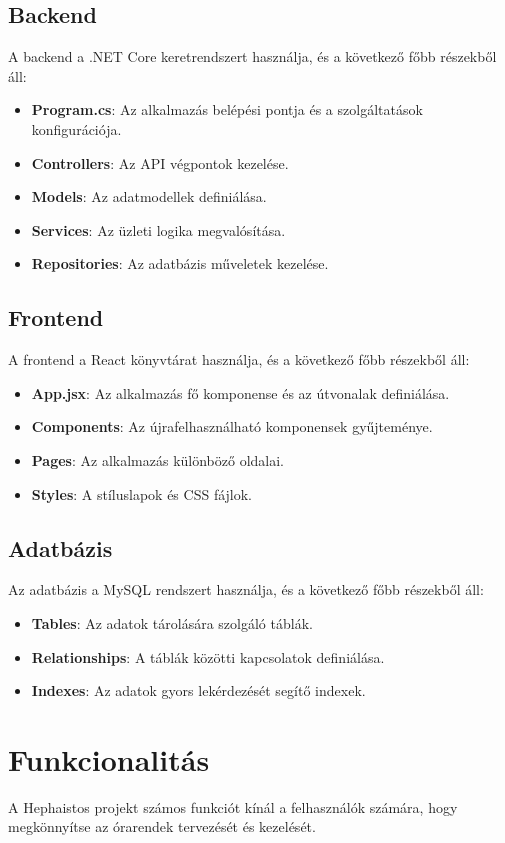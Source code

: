 \documentclass{article}
\begin{document}
\subsection{Backend}
A backend a .NET Core keretrendszert használja, és a következő főbb részekből áll:
\begin{itemize}
    \item \textbf{Program.cs}: Az alkalmazás belépési pontja és a szolgáltatások konfigurációja.
    \item \textbf{Controllers}: Az API végpontok kezelése.
    \item \textbf{Models}: Az adatmodellek definiálása.
    \item \textbf{Services}: Az üzleti logika megvalósítása.
    \item \textbf{Repositories}: Az adatbázis műveletek kezelése.
\end{itemize}

\subsection{Frontend}
A frontend a React könyvtárat használja, és a következő főbb részekből áll:
\begin{itemize}
    \item \textbf{App.jsx}: Az alkalmazás fő komponense és az útvonalak definiálása.
    \item \textbf{Components}: Az újrafelhasználható komponensek gyűjteménye.
    \item \textbf{Pages}: Az alkalmazás különböző oldalai.
    \item \textbf{Styles}: A stíluslapok és CSS fájlok.
\end{itemize}

\subsection{Adatbázis}
Az adatbázis a MySQL rendszert használja, és a következő főbb részekből áll:
\begin{itemize}
    \item \textbf{Tables}: Az adatok tárolására szolgáló táblák.
    \item \textbf{Relationships}: A táblák közötti kapcsolatok definiálása.
    \item \textbf{Indexes}: Az adatok gyors lekérdezését segítő indexek.
\end{itemize}

\section{Funkcionalitás}
A Hephaistos projekt számos funkciót kínál a felhasználók számára, hogy megkönnyítse az órarendek tervezését és kezelését.
\end{document}
